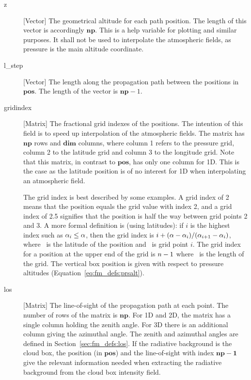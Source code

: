 \begin{description}
  \item[z] [Vector] The geometrical altitude for each path position. The
     length of this vector is accordingly $\mathbf{np}$. This is a help
     variable for plotting and similar purposes. It shall not be used to
     interpolate the atmospheric fields, as pressure is the main altitude
     coordinate.

  \item[l\_step] [Vector] The length along the propagation path between
     the positions in $\mathbf{pos}$. The length of the vector is
     $\mathbf{np}-1$. 

  \item[gridindex] [Matrix] The fractional grid indexes of the positions.
     The intention of this field is to speed up interpolation of the 
     atmospheric fields. The matrix has $\mathbf{np}$ rows and $\mathbf{dim}$ 
     columns, where column 1 refers to the pressure grid, column 2 to the 
     latitude grid and column 3 to the longitude grid. Note that this matrix,
     in contrast to $\mathbf{pos}$, has only one column for 1D. This is the 
     case as the latitude position is of no interest for 1D when interpolating
     an atmospheric field. 

     The grid index is best described by some examples. A grid index of
     2 means that the position equals the grid value with index 2, and
     a grid index of 2.5 signifies that the position is half the way between
     grid points 2 and 3. A more formal definition is (using latitudes):
     if $i$ is the highest index such as $\alpha_{i}\leq\alpha$, then the grid
     index is $i+(\alpha-\alpha_{i})/(\alpha_{i+1}-\alpha_{i})$, where \Lat\ is the 
     latitude of the position and \ is grid point $i$. The grid index 
     for a position at the upper end of the grid is $n-1$ where
     \VctLng\ is the length of the grid. The vertical box position is given 
     with respect to pressure altitudes (Equation~\ref{eq:fm_defs:prsalt}).
     
   \item[los] [Matrix] The line-of-sight of the propagation path at
     each point. The number of rows of the matrix is $\mathbf{np}$.
     For 1D and 2D, the matrix has a single column holding the zenith
     angle. For 3D there is an additional column giving the azimuthal
     angle. The zenith and azimuthal angles are defined in
     Section~\ref{sec:fm_defs:los}. If the radiative background is the
     cloud box, the position (in $\mathbf{pos}$) and the line-of-sight
     with index $\mathbf{np-1}$ give the relevant information needed
     when extracting the radiative background from the cloud box
     intensity field.
     

\end{description}
